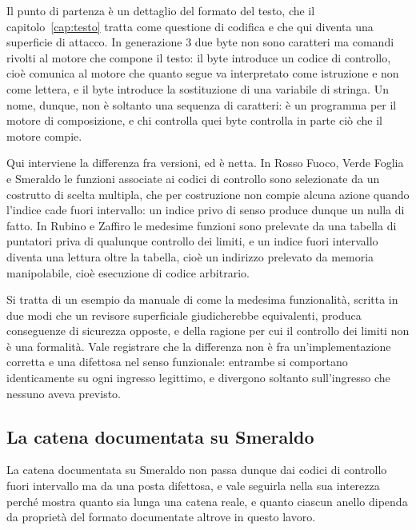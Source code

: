 Il punto di partenza è un dettaglio del formato del testo, che il capitolo~\ref{cap:testo} tratta come questione di codifica e che qui diventa una superficie di attacco. In generazione 3 due byte non sono caratteri ma comandi rivolti al motore che compone il testo: il byte  introduce un codice di controllo, cioè comunica al motore che quanto segue va interpretato come istruzione e non come lettera, e il byte  introduce la sostituzione di una variabile di stringa. Un nome, dunque, non è soltanto una sequenza di caratteri: è un programma per il motore di composizione, e chi controlla quei byte controlla in parte ciò che il motore compie.

Qui interviene la differenza fra versioni, ed è netta. In Rosso Fuoco, Verde Foglia e Smeraldo le funzioni associate ai codici di controllo sono selezionate da un costrutto di scelta multipla, che per costruzione non compie alcuna azione quando l'indice cade fuori intervallo: un indice privo di senso produce dunque un nulla di fatto. In Rubino e Zaffiro le medesime funzioni sono prelevate da una tabella di puntatori priva di qualunque controllo dei limiti, e un indice fuori intervallo diventa una lettura oltre la tabella, cioè un indirizzo prelevato da memoria manipolabile, cioè esecuzione di codice arbitrario.

Si tratta di un esempio da manuale di come la medesima funzionalità, scritta in due modi che un revisore superficiale giudicherebbe equivalenti, produca conseguenze di sicurezza opposte, e della ragione per cui il controllo dei limiti non è una formalità. Vale registrare che la differenza non è fra un'implementazione corretta e una difettosa nel senso funzionale: entrambe si comportano identicamente su ogni ingresso legittimo, e divergono soltanto sull'ingresso che nessuno aveva previsto.

\subsection{La catena documentata su Smeraldo}

La catena documentata su Smeraldo non passa dunque dai codici di controllo fuori intervallo ma da una posta difettosa, e vale seguirla nella sua interezza perché mostra quanto sia lunga una catena reale, e quanto ciascun anello dipenda da proprietà del formato documentate altrove in questo lavoro.

